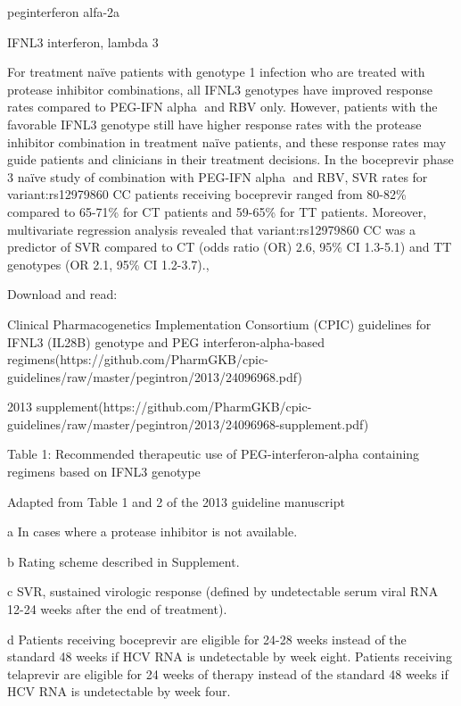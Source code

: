 \documentclass{resume} %
\begin{document}
\begin{rSection}{ peginterferon alfa-2a }
\begin{rSubsection}{ IFNL3 }{ interferon, lambda 3 }{}{}
 \newline
\item For treatment naïve patients with genotype 1 infection who are treated with protease inhibitor combinations, all IFNL3 genotypes have improved response rates compared to PEG-IFN alpha and RBV only. However, patients with the favorable IFNL3 genotype still have higher response rates with the protease inhibitor combination in treatment naïve patients, and these response rates may guide patients and clinicians in their treatment decisions. In the boceprevir phase 3 naïve study of combination with PEG-IFN alpha and RBV, SVR rates for variant:rs12979860 CC patients receiving boceprevir ranged from 80-82\% compared to 65-71\% for CT patients and 59-65\% for TT patients. Moreover, multivariate regression analysis revealed that variant:rs12979860 CC was a predictor of SVR compared to CT (odds ratio (OR) 2.6, 95\% CI 1.3-5.1) and TT genotypes (OR 2.1, 95\% CI 1.2-3.7)., 
 \newline
\item Download and read:
 \newline
\item Clinical Pharmacogenetics Implementation Consortium (CPIC) guidelines for IFNL3 (IL28B) genotype and PEG interferon-alpha-based regimens(https://github.com/PharmGKB/cpic-guidelines/raw/master/pegintron/2013/24096968.pdf) 
 \newline
\item 2013 supplement(https://github.com/PharmGKB/cpic-guidelines/raw/master/pegintron/2013/24096968-supplement.pdf)
 \newline
\item Table 1: Recommended therapeutic use of  PEG-interferon-alpha containing regimens based on IFNL3 genotype
 \newline
\item Adapted from Table 1 and 2 of the 2013 guideline manuscript
 \newline
\item a In cases where a protease inhibitor is not available. 
 \newline
\item b Rating scheme described in Supplement.
 \newline
\item c SVR,  sustained virologic response (defined by undetectable serum viral RNA 12-24 weeks after the end of treatment).
 \newline
\item d Patients receiving boceprevir are eligible for 24-28 weeks instead of the standard 48 weeks if HCV RNA is undetectable by week eight. Patients receiving telaprevir are eligible for 24 weeks of therapy instead of the standard 48 weeks if HCV RNA is undetectable by week four.

\end{rSubsection}
\end{rSection}
\end{document}
